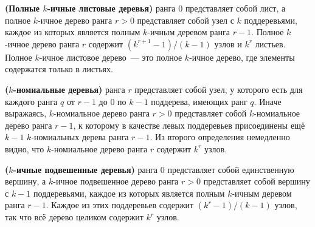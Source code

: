 \begin{definition}\label{def:9.4}
  \textbf{(Полные $k$-ичные листовые деревья)}  ранга 0 представляет собой лист, а полное $k$-ичное
  дерево ранга $r > 0$ представляет собой узел с $k$ поддеревьями,
  каждое из которых является полным $k$-ичным деревом ранга
  $r-1$. Полное $k$-ичное дерево ранга $r$ содержит $(k^{r+1} - 1) /
  (k - 1)$ узлов и $k^r$ листьев. Полное $k$-ичное листовое дерево~---
  это полное $k$-ичное дерево, где элементы содержатся только в листьях.
\end{definition}
\begin{definition}\label{def:9.5}
  \textbf{($k$-номиальные деревья)}  ранга $r$ представляет собой узел, у
  которого есть для каждого ранга $q$ от $r-1$ до 0 по $k-1$
  поддерева, имеющих ранг $q$. Иначе выражаясь,
  $k$-номиальное дерево ранга $r > 0$ представляет собой
  $k$-номиальное дерево ранга $r-1$, к которому в качестве левых
  поддеревьев присоединены ещё $k-1$ $k$-номиальных дерева ранга
  $r-1$. Из второго определения немедленно видно, что $k$-номиальное
  дерево ранга $r$ содержит $k^r$ узлов.
\end{definition}

\begin{definition}\label{def:9.6}
  \textbf{($k$-ичные подвешенные деревья)}  ранга 0 представляет собой единственную
вершину, а $k$-ичное подвешенное дерево ранга $r > 0$ представляет
собой вершину с $k-1$ поддеревьями, каждое из которых является полным
$k$-ичным деревом ранга $r-1$. Каждое из этих поддеревьев содержит
$(k^r - 1) / (k - 1)$ узлов, так что всё дерево целиком содержит $k^r$ узлов.
\end{definition}

